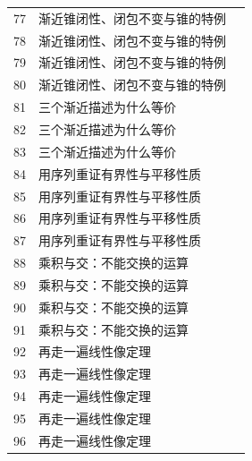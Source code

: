 \begin{longtable}{r p{.66\linewidth} r}
77 & 渐近锥闭性、闭包不变与锥的特例 & \pageref{g:109:76}\\

78 & 渐近锥闭性、闭包不变与锥的特例 & \pageref{g:109:76}\\

79 & 渐近锥闭性、闭包不变与锥的特例 & \pageref{g:109:76}\\

80 & 渐近锥闭性、闭包不变与锥的特例 & \pageref{g:109:76}\\

81 & 三个渐近描述为什么等价 & \pageref{g:109:81}\\

82 & 三个渐近描述为什么等价 & \pageref{g:109:81}\\

83 & 三个渐近描述为什么等价 & \pageref{g:109:81}\\

84 & 用序列重证有界性与平移性质 & \pageref{g:109:84}\\

85 & 用序列重证有界性与平移性质 & \pageref{g:109:84}\\

86 & 用序列重证有界性与平移性质 & \pageref{g:109:84}\\

87 & 用序列重证有界性与平移性质 & \pageref{g:109:84}\\

88 & 乘积与交：不能交换的运算 & \pageref{g:109:88}\\

89 & 乘积与交：不能交换的运算 & \pageref{g:109:88}\\

90 & 乘积与交：不能交换的运算 & \pageref{g:109:88}\\

91 & 乘积与交：不能交换的运算 & \pageref{g:109:88}\\

92 & 再走一遍线性像定理 & \pageref{g:109:92}\\

93 & 再走一遍线性像定理 & \pageref{g:109:92}\\

94 & 再走一遍线性像定理 & \pageref{g:109:92}\\

95 & 再走一遍线性像定理 & \pageref{g:109:92}\\

96 & 再走一遍线性像定理 & \pageref{g:109:92}\\


\end{longtable}
